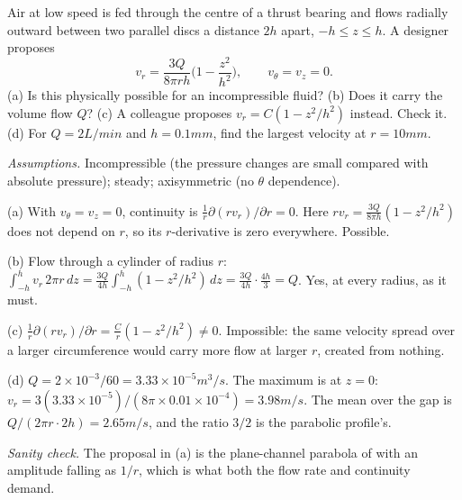 \begin{example}
Air at low speed is fed through the centre of a thrust bearing and flows radially outward between two parallel discs a distance $2h$ apart, $-h \le z \le h$. A designer proposes
\[
v_r = \frac{3Q}{8\pi r h}\Big(1 - \frac{z^2}{h^2}\Big), \qquad v_\theta = v_z = 0 .
\]
(a) Is this physically possible for an incompressible fluid? (b) Does it carry the volume flow $Q$? (c) A colleague proposes $v_r = C(1 - z^2/h^2)$ instead. Check it. (d) For $Q = 2\unit{L/min}$ and $h = 0.1\unit{mm}$, find the largest velocity at $r = 10\unit{mm}$.

\emph{Assumptions.} Incompressible (the pressure changes are small compared with absolute pressure); steady; axisymmetric (no $\theta$ dependence).

(a) With $v_\theta = v_z = 0$, continuity is $\frac{1}{r}\partial(r v_r)/\partial r = 0$. Here $r v_r = \frac{3Q}{8\pi h}(1 - z^2/h^2)$ does not depend on $r$, so its $r$-derivative is zero everywhere. Possible.

(b) Flow through a cylinder of radius $r$: $\int_{-h}^{h} v_r\,2\pi r\,dz = \frac{3Q}{4h}\int_{-h}^{h}(1 - z^2/h^2)\,dz = \frac{3Q}{4h}\cdot\frac{4h}{3} = Q$. Yes, at every radius, as it must.

(c) $\frac{1}{r}\partial(r v_r)/\partial r = \frac{C}{r}(1 - z^2/h^2) \ne 0$. Impossible: the same velocity spread over a larger circumference would carry more flow at larger $r$, created from nothing.

(d) $Q = 2 \times 10^{-3}/60 = 3.33\times 10^{-5}\unit{m^3/s}$. The maximum is at $z = 0$: $v_r = 3(3.33\times10^{-5})/(8\pi \times 0.01 \times 10^{-4}) = 3.98\unit{m/s}$. The mean over the gap is $Q/(2\pi r\cdot 2h) = 2.65\unit{m/s}$, and the ratio $3/2$ is the parabolic profile's.

\emph{Sanity check.} The proposal in (a) is the plane-channel parabola of  with an amplitude falling as $1/r$, which is what both the flow rate and continuity demand.
\end{example}

